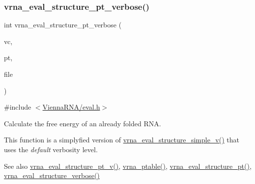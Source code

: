 \subsubsection{\texorpdfstring{vrna\+\_\+eval\+\_\+structure\+\_\+pt\+\_\+verbose()}{vrna\_eval\_structure\_pt\_verbose()}}
{\footnotesize\ttfamily int vrna\+\_\+eval\+\_\+structure\+\_\+pt\+\_\+verbose (\begin{DoxyParamCaption}\item[{\mbox{\hyperlink{group__fold__compound_ga1b0cef17fd40466cef5968eaeeff6166}{vrna\+\_\+fold\+\_\+compound\+\_\+t}} $\ast$}]{vc,  }\item[{const short $\ast$}]{pt,  }\item[{F\+I\+LE $\ast$}]{file }\end{DoxyParamCaption})}



{\ttfamily \#include $<$\mbox{\hyperlink{eval_8h}{Vienna\+R\+N\+A/eval.\+h}}$>$}



Calculate the free energy of an already folded R\+NA. 

This function is a simplyfied version of \mbox{\hyperlink{group__eval_gacd6278343e77d13f1d53588e50d303bc}{vrna\+\_\+eval\+\_\+structure\+\_\+simple\+\_\+v()}} that uses the {\itshape default} verbosity level.

\begin{DoxySeeAlso}{See also}
\mbox{\hyperlink{group__eval_ga2c6533ba0afe4c88d335d8f1e0e2a48e}{vrna\+\_\+eval\+\_\+structure\+\_\+pt\+\_\+v()}}, \mbox{\hyperlink{group__struct__utils_gae829fb8bb7f694c12a9c0bbc34c77c60}{vrna\+\_\+ptable()}}, \mbox{\hyperlink{group__eval_gadbd09372ddfd7a450bbd590c96a6bfe4}{vrna\+\_\+eval\+\_\+structure\+\_\+pt()}}, \mbox{\hyperlink{group__eval_ga0928d699d310178f84ee2351034e5cb5}{vrna\+\_\+eval\+\_\+structure\+\_\+verbose()}}
\end{DoxySeeAlso}

